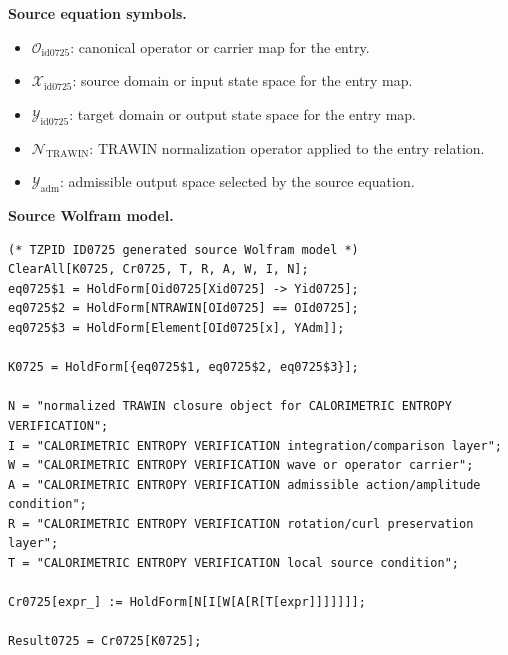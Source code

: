 \begin{minipage}[t]{0.49\linewidth}
\begingroup
\small
\raggedright
\textbf{Source equation symbols.}\par
\begin{itemize}[leftmargin=1.35em,itemsep=1pt,topsep=1pt,parsep=0pt]
    \item $\mathcal{O}_{\mathrm{id0725}}$: canonical operator or carrier map for the entry.
    \item $\mathcal{X}_{\mathrm{id0725}}$: source domain or input state space for the entry map.
    \item $\mathcal{Y}_{\mathrm{id0725}}$: target domain or output state space for the entry map.
    \item $\mathcal{N}_{\mathrm{TRAWIN}}$: TRAWIN normalization operator applied to the entry relation.
    \item $\mathcal{Y}_{\mathrm{adm}}$: admissible output space selected by the source equation.
\end{itemize}
\endgroup
\end{minipage}\hfill
\begin{minipage}[t]{0.47\linewidth}
\begingroup
\scriptsize
\raggedright
\textbf{Source Wolfram model.}\par
\begin{Verbatim}[fontsize=\tiny,breaklines=true,breakanywhere=true]
(* TZPID ID0725 generated source Wolfram model *)
ClearAll[K0725, Cr0725, T, R, A, W, I, N];
eq0725$1 = HoldForm[Oid0725[Xid0725] -> Yid0725];
eq0725$2 = HoldForm[NTRAWIN[OId0725] == OId0725];
eq0725$3 = HoldForm[Element[OId0725[x], YAdm]];

K0725 = HoldForm[{eq0725$1, eq0725$2, eq0725$3}];

N = "normalized TRAWIN closure object for CALORIMETRIC ENTROPY VERIFICATION";
I = "CALORIMETRIC ENTROPY VERIFICATION integration/comparison layer";
W = "CALORIMETRIC ENTROPY VERIFICATION wave or operator carrier";
A = "CALORIMETRIC ENTROPY VERIFICATION admissible action/amplitude condition";
R = "CALORIMETRIC ENTROPY VERIFICATION rotation/curl preservation layer";
T = "CALORIMETRIC ENTROPY VERIFICATION local source condition";

Cr0725[expr_] := HoldForm[N[I[W[A[R[T[expr]]]]]]];

Result0725 = Cr0725[K0725];
\end{Verbatim}
\endgroup
\end{minipage}

